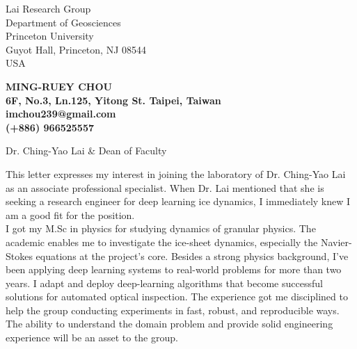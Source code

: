 \documentclass[12pt]{letter} %
\begin{document}

\begin{letter}{
Lai Research Group\\
Department of Geosciences\\
Princeton University\\
Guyot Hall, Princeton, NJ 08544\\
USA
} 


\begin{center}
\large\bf MING-RUEY CHOU\\ %
6F, No.3, Ln.125, Yitong St. Taipei, Taiwan\\imchou239@gmail.com\\(+886) 966525557%
\end{center} 
\vfill

\signature{Ming-Ruey Chou} %


\opening{Dr. Ching-Yao Lai \& Dean of Faculty} 

This letter expresses my interest in joining the laboratory of Dr. Ching-Yao Lai as an associate professional specialist.
When Dr. Lai mentioned that she is seeking a research engineer for deep learning ice dynamics, I immediately knew I am a good fit for the position.\\

I got my M.Sc in physics for studying dynamics of granular physics.
The academic enables me to investigate the ice-sheet dynamics, especially the Navier-Stokes equations at the project's core.
Besides a strong physics background, I've been applying deep learning systems to real-world problems for more than two years.
I adapt and deploy deep-learning algorithms that become successful solutions for automated optical inspection.
The experience got me disciplined to help the group conducting experiments in fast, robust, and reproducible ways.
The ability to understand the domain problem and provide solid engineering experience will be an asset to the group.\\


\end{letter}
\end{document}
